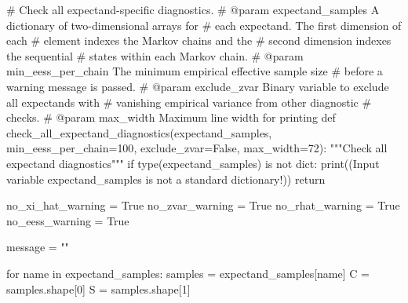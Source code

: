 \documentclass[
  letterpaper,
  DIV=11,
  numbers=noendperiod]{scrartcl}
\newenvironment{Shaded}{\begin{snugshade}}{\end{snugshade}}
\newcommand{\BuiltInTok}[1]{\textcolor[rgb]{0.00,0.23,0.31}{#1}}
\newcommand{\CommentTok}[1]{\textcolor[rgb]{0.37,0.37,0.37}{#1}}
\newcommand{\ControlFlowTok}[1]{\textcolor[rgb]{0.00,0.23,0.31}{#1}}
\newcommand{\DecValTok}[1]{\textcolor[rgb]{0.68,0.00,0.00}{#1}}
\newcommand{\KeywordTok}[1]{\textcolor[rgb]{0.00,0.23,0.31}{#1}}
\newcommand{\NormalTok}[1]{\textcolor[rgb]{0.00,0.23,0.31}{#1}}
\newcommand{\OperatorTok}[1]{\textcolor[rgb]{0.37,0.37,0.37}{#1}}
\newcommand{\StringTok}[1]{\textcolor[rgb]{0.13,0.47,0.30}{#1}}
\newcommand{\VariableTok}[1]{\textcolor[rgb]{0.07,0.07,0.07}{#1}}
\begin{document}
\begin{Shaded}
\begin{Highlighting}[]
\CommentTok{\# Check all expectand{-}specific diagnostics.}
\CommentTok{\# @param expectand\_samples A dictionary of two{-}dimensional arrays for }
\CommentTok{\#                          each expectand.  The first dimension of each}
\CommentTok{\#                          element indexes the Markov chains and the }
\CommentTok{\#                          second dimension indexes the sequential }
\CommentTok{\#                          states within each Markov chain.}
\CommentTok{\# @param min\_eess\_per\_chain The minimum empirical effective sample size}
\CommentTok{\#                           before a warning message is passed.}
\CommentTok{\# @param exclude\_zvar Binary variable to exclude all expectands with}
\CommentTok{\#                     vanishing empirical variance from other diagnostic}
\CommentTok{\#                     checks.}
\CommentTok{\# @param max\_width Maximum line width for printing}
\KeywordTok{def}\NormalTok{ check\_all\_expectand\_diagnostics(expectand\_samples,}
\NormalTok{                                    min\_eess\_per\_chain}\OperatorTok{=}\DecValTok{100}\NormalTok{,}
\NormalTok{                                    exclude\_zvar}\OperatorTok{=}\VariableTok{False}\NormalTok{,}
\NormalTok{                                    max\_width}\OperatorTok{=}\DecValTok{72}\NormalTok{):}
  \CommentTok{"""Check all expectand diagnostics"""}
  \ControlFlowTok{if} \BuiltInTok{type}\NormalTok{(expectand\_samples) }\KeywordTok{is} \KeywordTok{not} \BuiltInTok{dict}\NormalTok{:}
    \BuiltInTok{print}\NormalTok{((}\StringTok{\textquotesingle{}Input variable \textasciigrave{}expectand\_samples\textasciigrave{} \textquotesingle{}}
           \StringTok{\textquotesingle{}is not a standard dictionary!\textquotesingle{}}\NormalTok{))}
    \ControlFlowTok{return}
  
\NormalTok{  no\_xi\_hat\_warning }\OperatorTok{=} \VariableTok{True} 
\NormalTok{  no\_zvar\_warning }\OperatorTok{=} \VariableTok{True}
\NormalTok{  no\_rhat\_warning }\OperatorTok{=} \VariableTok{True}
\NormalTok{  no\_eess\_warning }\OperatorTok{=} \VariableTok{True}
  
\NormalTok{  message }\OperatorTok{=} \StringTok{""}
  
  \ControlFlowTok{for}\NormalTok{ name }\KeywordTok{in}\NormalTok{ expectand\_samples:}
\NormalTok{    samples }\OperatorTok{=}\NormalTok{ expectand\_samples[name]}
\NormalTok{    C }\OperatorTok{=}\NormalTok{ samples.shape[}\DecValTok{0}\NormalTok{]}
\NormalTok{    S }\OperatorTok{=}\NormalTok{ samples.shape[}\DecValTok{1}\NormalTok{]}
    

\end{Highlighting}
\end{Shaded}
\end{document}
